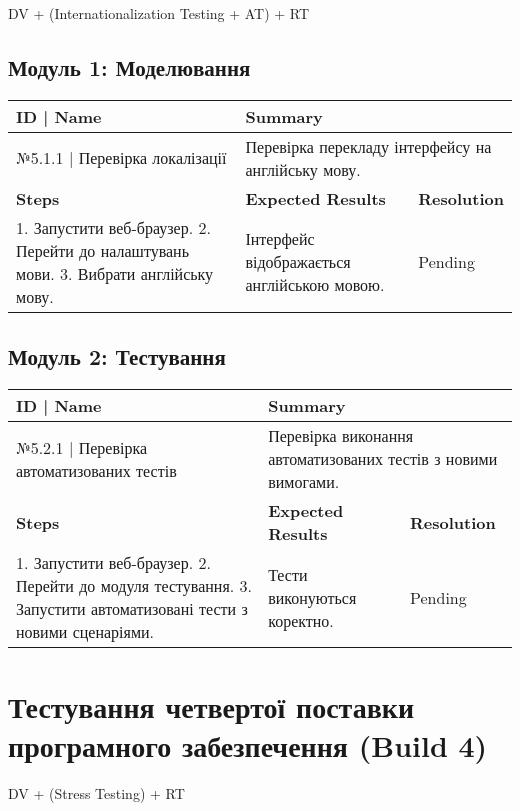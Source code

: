 \documentclass[oneside,14pt]{extarticle}
\begin{document}
\begin{normalsize}
	DV + (Internationalization Testing + AT) + RT
	
	\subsection*{Модуль 1: Моделювання}
	\begin{longtable}{|p{7cm}|p{3.5cm}|p{3.5cm}|}
		\hline
		\textbf{ID | Name} & \multicolumn{2}{|p{7cm}|}{\textbf{Summary}}
		\\\hline
		№5.1.1 | Перевірка локалізації & \multicolumn{2}{|p{7cm}|}{Перевірка перекладу інтерфейсу на англійську мову.}
		\\\hline
		\textbf{Steps} & \textbf{Expected Results} & \textbf{Resolution}
		\\\hline
		1. Запустити веб-браузер. 2. Перейти до налаштувань мови. 3. Вибрати англійську мову.
		& Інтерфейс відображається англійською мовою.
		& Pending
		\\\hline
	\end{longtable}
	
	\subsection*{Модуль 2: Тестування}
	\begin{longtable}{|p{7cm}|p{3.5cm}|p{3.5cm}|}
		\hline
		\textbf{ID | Name} & \multicolumn{2}{|p{7cm}|}{\textbf{Summary}}
		\\\hline
		№5.2.1 | Перевірка автоматизованих тестів & \multicolumn{2}{|p{7cm}|}{Перевірка виконання автоматизованих тестів з новими вимогами.}
		\\\hline
		\textbf{Steps} & \textbf{Expected Results} & \textbf{Resolution}
		\\\hline
		1. Запустити веб-браузер. 2. Перейти до модуля тестування. 3. Запустити автоматизовані тести з новими сценаріями.
		& Тести виконуються коректно.
		& Pending
		\\\hline
	\end{longtable}
	
	\section*{Тестування четвертої поставки програмного забезпечення (Build 4)}
	
	DV + (Stress Testing) + RT
	

\end{normalsize}
\end{document}
